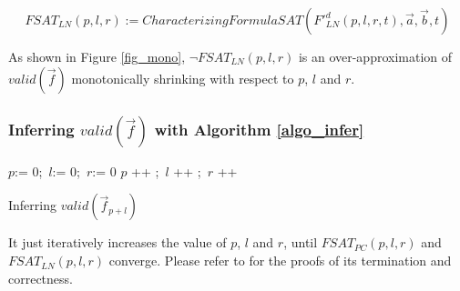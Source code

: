 \begin{equation}\label{fsat_ln}
FSAT_{LN}(p,l,r):=CharacterizingFormulaSAT(F'^d_{LN}(p,l,r,t),\vec{a},\vec{b},t)
\end{equation}

As shown in Figure \ref{fig_mono},
%
$\neg FSAT_{LN}(p,l,r)$ is an over-approximation of $valid(\vec{f})$ monotonically shrinking with respect to
$p$, $l$ and $r$.




\subsubsection{Inferring $valid(\vec{f})$ with Algorithm \ref{algo_infer}}\label{subsub_overal}
\begin{algorithm}[t]
\SetAlgoVlined
$p$:= $0$;~$l$:= $0$;~$r$:= $0$ \;
 {
  $p$ ++ ;~$l$ ++ ;~$r$ ++ \;
}
\caption{Inferring $valid(\vec{f}_{p+l})$}
\label{algo_infer}
\end{algorithm}

It just iteratively increases the value of $p$, $l$ and $r$,
until $FSAT_{PC}(p,l,r)$ and $FSAT_{LN}(p,l,r)$ converge.
Please refer to \cite{QinTODAES15} for the proofs of its termination and correctness.







